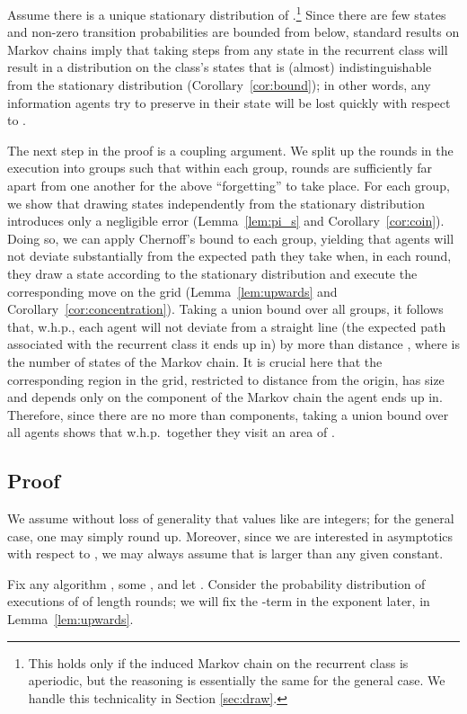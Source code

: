\documentclass[11pt]{article}
\begin{document}
Assume there is a unique stationary distribution of .\footnote{This holds only if the induced Markov chain on the recurrent class is aperiodic, but the reasoning is essentially the same for the general case. We handle this technicality in Section \ref{sec:draw}.} Since there are few states and non-zero transition probabilities are bounded from below, standard results on Markov chains imply that taking  steps from any state in the recurrent class will result in a distribution on the class's states that is (almost) indistinguishable from the stationary distribution (Corollary~\ref{cor:bound}); in other words, any information agents try to preserve in their state will be lost quickly with respect to .

The next step in the proof is a coupling argument. We split up the rounds in the execution into groups such that within each group, rounds are sufficiently far apart from one another for the above ``forgetting'' to take place. For each group, we show that drawing states independently from the stationary distribution introduces only a negligible error (Lemma~\ref{lem:pi_s} and Corollary~\ref{cor:coin}). Doing so, we can apply Chernoff's bound to each group, yielding that agents will not deviate substantially from the expected path they take when, in each round, they draw a state according to the stationary distribution and execute the corresponding move on the grid (Lemma~\ref{lem:upwards} and Corollary~\ref{cor:concentration}). Taking a union bound over all groups, it follows that, w.h.p., each agent will not deviate from a straight line (the expected path associated with the recurrent class it ends up in) by more than distance , where  is the number of states of the Markov chain. It is crucial here that the corresponding region in the grid, restricted to distance  from the origin, has size  and depends only on the component of the Markov chain the agent ends up in. Therefore, since there are no more than  components, taking a union bound over all agents shows that w.h.p.\ together they visit an area of .


\subsection{Proof}
We assume without loss of generality that values like  are integers; for the general case, one may simply round up. Moreover, since we are interested in asymptotics with respect to , we may always assume that  is larger than any given constant.

Fix any algorithm , some , and let . Consider the probability distribution of executions of  of length  rounds; we will fix the -term in the exponent later, in Lemma~\ref{lem:upwards}. 
\end{document}

